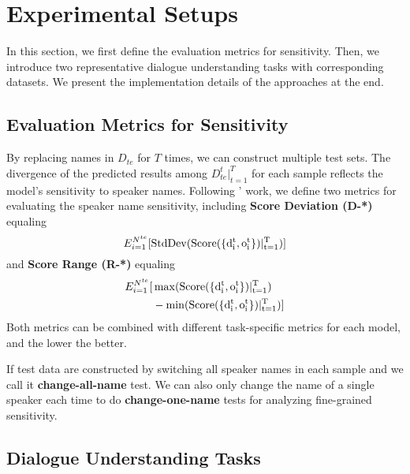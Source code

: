 

\section{Experimental Setups}
In this section, we first define the evaluation metrics for sensitivity. Then, we introduce two representative dialogue understanding tasks with corresponding datasets. We present the implementation details of the approaches at the end.



\subsection{Evaluation Metrics for Sensitivity}
\label{sec:quatification}

By replacing names in $D_{te}$ for $T$ times, we can construct multiple test sets. The divergence of the predicted results among $D^t_{te}|_{t=1}^T$ for each sample reflects the model's sensitivity to speaker names. Following \citet{prabhakaran2019perturbation}' work, we define two metrics for evaluating the speaker name sensitivity, including 
\textbf{Score Deviation (D-*)} equaling
\begin{equation}
	E_{i=1}^{N^{te}} [ \rm{StdDev} (Score(\{d^t_i, o^t_i\})|_{t=1}^T) ]
\end{equation}
and \textbf{Score Range (R-*)} equaling
\begin{equation}
	\begin{aligned}
		E_{i=1}^{N^{te}} [& \max(\rm{Score}(\{d^t_i, o^t_i\})|_{t=1}^T) \\
		&-  \min(\rm{Score}(\{d^t_i, o^t_i\})|_{t=1}^T)]
	\end{aligned}
\end{equation}
Both metrics can be combined with different task-specific metrics for each model, and the lower the better.

If test data are constructed by switching all speaker names in each sample and we call it \textbf{change-all-name} test. We can also only change the name of a single speaker each time to do \textbf{change-one-name} tests for analyzing fine-grained sensitivity.%


\subsection{Dialogue Understanding Tasks}




